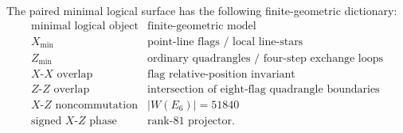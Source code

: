 \begin{corollary}
The paired minimal logical surface has the following finite-geometric dictionary:
\[
\begin{array}{c|c}
\text{minimal logical object} & \text{finite-geometric model}\\
\hline
X_{\min} & \text{point-line flags / local line-stars}\\
Z_{\min} & \text{ordinary quadrangles / four-step exchange loops}\\
X\text{-}X\text{ overlap} & \text{flag relative-position invariant}\\
Z\text{-}Z\text{ overlap} & \text{intersection of eight-flag quadrangle boundaries}\\
X\text{-}Z\text{ noncommutation} & |W(E_6)|=51840\\
\text{signed }X\text{-}Z\text{ phase} & \text{rank-}81\text{ projector}.
\end{array}
\]
\end{corollary}
